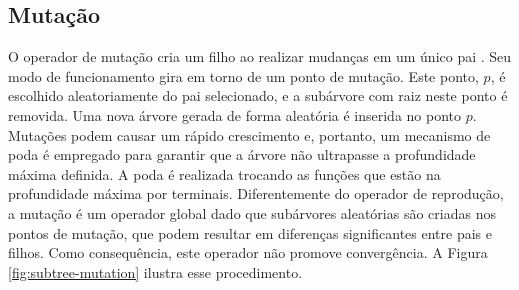 \subsection{Mutação}
O operador de mutação cria um filho ao realizar mudanças em um único pai \cite{poli2008,banzhaf1998,koza1992}. Seu modo de funcionamento gira em torno de um ponto de mutação. Este ponto, $p$, é escolhido aleatoriamente do pai selecionado, e a subárvore com raiz neste ponto é removida. Uma nova árvore gerada de forma aleatória é inserida no ponto $p$. Mutações podem causar um rápido crescimento e, portanto, um mecanismo de poda é empregado para garantir que a árvore não ultrapasse a profundidade máxima definida. A poda é realizada trocando as funções que estão na profundidade máxima por terminais. Diferentemente do operador de reprodução, a mutação é um operador global dado que subárvores aleatórias são criadas nos pontos de mutação, que podem resultar em diferenças significantes entre pais e filhos. Como consequência, este operador não promove convergência. A Figura \ref{fig:subtree-mutation} ilustra esse procedimento.

